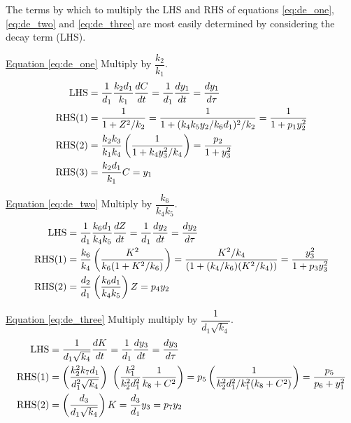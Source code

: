 \documentclass[10pt,letterpaper]{article}
\begin{document}
\bigskip
{}

The terms by which to multiply the LHS and RHS of equations \ref{eq:de_one}, \ref{eq:de_two} and \ref{eq:de_three} are most easily determined by considering the decay term (LHS).

\medskip
\noindent\underline{Equation \eqref{eq:de_one}} \enskip Multiply by $\dfrac{k_2}{k_1}$.
\begin{equation*}
\begin{gathered}\begin{aligned}
{\rm LHS} &= \frac{1}{d_1} \frac{k_2 d_1}{k_1} \frac{dC}{dt}
           = \frac{1}{d_1} \frac{dy_1}{dt}
           = \frac{dy_1}{d\tau} \\
{\rm RHS(1)} &= \frac{1}{1 + Z^2/k_2}
              = \frac{1}{1 + (k_4 k_5 y_2 / k_6 d_1)^2/k_2}
              = \frac{1}{1 + p_1 y_2^2} \\
{\rm RHS(2)} &= \frac{k_2 k_3}{k_1 k_4} \left( \frac{1}{1 + k_4 y_3^2/k_4} \right)
              = \frac{p_2}{1 + y_3^2}  \\
{\rm RHS(3)} &= \frac{k_2 d_1}{k_1} C = y_1
\end{aligned}\end{gathered}
\end{equation*}

\medskip
\noindent\underline{Equation \eqref{eq:de_two}} \enskip Multiply by $\dfrac{k_6}{k_4 k_5}$.
\begin{equation*}
\begin{gathered}\begin{aligned}
{\rm LHS} &= \frac{1}{d_1} \frac{k_6 d_1}{k_4 k_5} \frac{dZ}{dt}
           = \frac{1}{d_1} \frac{dy_2}{dt}
           = \frac{dy_2}{d\tau} \\
{\rm RHS(1)} &= \frac{k_6}{k_4} \left( \frac{K^2}{k_6(1 + K^2/k_6)} \right)
              = \frac{K^2/k_4}{(1 + (k_4/k_6)(K^2/k_4))}
              = \frac{y_3^2}{1 + p_3 y_3^2} \\
{\rm RHS(2)} &= \frac{d_2}{d_1}\left(\frac{k_6 d_1}{k_4 k_5}\right) Z
              = p_4 y_2
\end{aligned}\end{gathered}
\end{equation*}

\medskip
\noindent\underline{Equation \eqref{eq:de_three}} \enskip Multiply  multiply by $\dfrac{1}{d_1 \sqrt{k_4}}$.
\begin{equation*}
\begin{gathered}\begin{aligned}
{\rm LHS} &= \frac{1}{d_1 \sqrt{k_4}} \frac{dK}{dt}
           = \frac{1}{d_1} \frac{dy_3}{dt}
           = \frac{dy_3}{d\tau} \\
{\rm RHS(1)} &= \left( \frac{k_2^2 k_7 d_1}{d_1^2 \sqrt{k_4}} \right) \
              \left(  \frac{k_1^2}{k_2^2 d_1^2} \frac{1}{k_8 + C^2} \right)
              = p_5 \left( \frac{1}{ k_2^2 d_1^2 / k_1^2 (k_8+C^2)}\right)
              = \frac{p_5}{ p_6 + y_1^2}  \\
{\rm RHS(2)} &= \left( \frac{d_3}{d_1 \sqrt{k_4}} \right) K = \frac{d_3}{d_1} y_3 = p_7 y_2
\end{aligned}\end{gathered}
\end{equation*}
\end{document}
